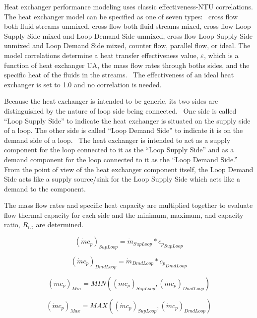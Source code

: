 Heat exchanger performance modeling uses classic effectiveness-NTU correlations. The heat exchanger model can be specified as one of seven types: ~cross flow both fluid streams unmixed, cross flow both fluid streams mixed, cross flow Loop Supply Side mixed and Loop Demand Side unmixed, cross flow Loop Supply Side unmixed and Loop Demand Side mixed, counter flow, parallel flow, or ideal. The model correlations determine a heat transfer effectiveness value, \(\varepsilon\), which is a function of heat exchanger UA, the mass flow rates through boths sides, and the specific heat of the fluids in the streams.~ The effectiveness of an ideal heat exchanger is set to 1.0 and no correlation is needed.

Because the heat exchanger is intended to be generic, its two sides are distinguished by the nature of loop side being connected.~ One side is called ``Loop Supply Side'' to indicate the heat exchanger is situated on the supply side of a loop. The other side is called ``Loop Demand Side'' to indicate it is on the demand side of a loop.~ The heat exchanger is intended to act as a supply component for the loop connected to it as the ``Loop Supply Side'' and as a demand component for the loop connected to it as the ``Loop Demand Side.''~ From the point of view of the heat exchanger component itself, the Loop Demand Side acts like a supply source/sink for the Loop Supply Side which acts like a demand to the component.

The mass flow rates and specific heat capacity are multiplied together to evaluate flow thermal capacity for each side and the minimum, maximum, and capacity ratio, \({R_C}\), are determined.

\begin{equation}
{\left( {\dot m{c_p}} \right)_{SupLoop}} = {\dot m_{SupLoop}}*{c_p}_{SupLoop}
\end{equation}

\begin{equation}
{\left( {\dot m{c_p}} \right)_{DmdLoop}} = {\dot m_{DmdLoop}}*{c_p}_{DmdLoop}
\end{equation}

\begin{equation}
{\left( {\dot m{c_p}} \right)_{Min}} = MIN\left( {{{\left( {\dot m{c_p}} \right)}_{SupLoop}},{{\left( {\dot m{c_p}} \right)}_{DmdLoop}}} \right)
\end{equation}

\begin{equation}
{\left( {\dot m{c_p}} \right)_{Max}} = MAX\left( {{{\left( {\dot m{c_p}} \right)}_{SupLoop}},{{\left( {\dot m{c_p}} \right)}_{DmdLoop}}} \right)
\end{equation}

